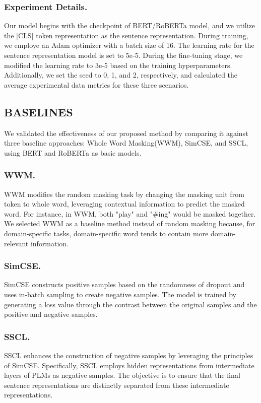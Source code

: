 \subsubsection{Experiment Details.} Our model begins with the checkpoint of BERT/RoBERTa model, and we utilize the [CLS] token representation as the sentence representation. During training, we employe an Adam optimizer with a batch size of 16. The learning rate for the sentence representation model is set to 5e-5. During the fine-tuning stage, we modified the learning rate to 3e-5 based on the training hyperparameters. Additionally, we set the seed to 0, 1, and 2, respectively, and calculated the average experimental data metrics for these three scenarios.

\subsection{BASELINES}
We validated the effectiveness of our proposed method by comparing it against three baseline approaches: Whole Word Masking(WWM), SimCSE, and SSCL\cite{sscl}, using BERT and RoBERTa as basic models.

\subsubsection{WWM.} WWM modifies the random masking task by changing the masking unit from token to whole word, leveraging contextual information to predict the masked word. For instance, in WWM, both "play" and "\#ing" would be masked together. We selected WWM as a baseline method instead of random masking because, for domain-specific tasks, domain-specific word tends to contain more domain-relevant information.

\subsubsection{SimCSE.} SimCSE constructs positive samples based on the randomness of dropout and uses in-batch sampling to create negative samples. The model is trained by generating a loss value through the contrast between the original samples and the positive and negative samples.

\subsubsection{SSCL.} SSCL enhances the construction of negative samples by leveraging the principles of SimCSE. Specifically, SSCL employs hidden representations from intermediate layers of PLMs as negative samples. The objective is to ensure that the final sentence representations are distinctly separated from these intermediate representations.

